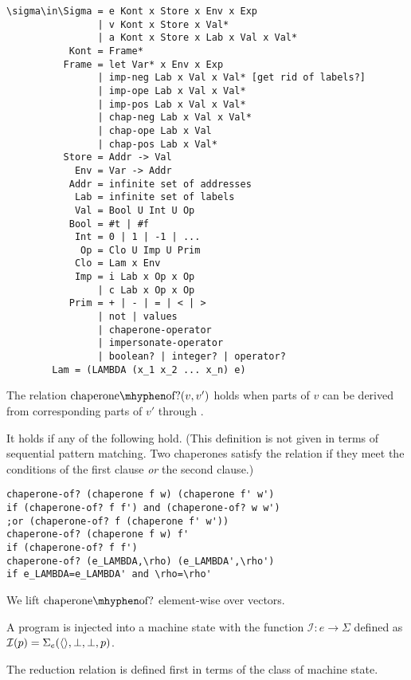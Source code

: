 \documentclass{sigplanconf}
\begin{document}
\begin{verbatim}
\sigma\in\Sigma = e Kont x Store x Env x Exp
                | v Kont x Store x Val*
                | a Kont x Store x Lab x Val x Val*
           Kont = Frame*
          Frame = let Var* x Env x Exp
                | imp-neg Lab x Val x Val* [get rid of labels?]
                | imp-ope Lab x Val x Val*
                | imp-pos Lab x Val x Val*
                | chap-neg Lab x Val x Val*
                | chap-ope Lab x Val
                | chap-pos Lab x Val*
          Store = Addr -> Val
            Env = Var -> Addr
           Addr = infinite set of addresses
            Lab = infinite set of labels
            Val = Bool U Int U Op
           Bool = #t | #f
            Int = 0 | 1 | -1 | ...
             Op = Clo U Imp U Prim
            Clo = Lam x Env
            Imp = i Lab x Op x Op
                | c Lab x Op x Op
           Prim = + | - | = | < | >
                | not | values
                | chaperone-operator
                | impersonate-operator
                | boolean? | integer? | operator?
 	    Lam = (LAMBDA (x_1 x_2 ... x_n) e)
\end{verbatim}

The relation $\mathrm{chaperone\mhyphen of?}(v,v')$ holds when parts of $v$ can be derived from corresponding parts of $v'$ through .

It holds if any of the following hold.
(This definition is not given in terms of sequential pattern matching. Two chaperones satisfy the relation if they meet the conditions of the first clause \emph{or} the second clause.)
\begin{verbatim}
chaperone-of? (chaperone f w) (chaperone f' w')
if (chaperone-of? f f') and (chaperone-of? w w')
;or (chaperone-of? f (chaperone f' w'))
chaperone-of? (chaperone f w) f'
if (chaperone-of? f f')
chaperone-of? (e_LAMBDA,\rho) (e_LAMBDA',\rho')
if e_LAMBDA=e_LAMBDA' and \rho=\rho'
\end{verbatim}

We lift $\mathrm{chaperone\mhyphen of?}$ element-wise over vectors.


A program is injected into a machine state with the function $\mathcal{I} : e\rightarrow\Sigma$ defined as $\mathcal{I}(p)=\Sigma_e(\langle\rangle,\perp,\perp,p)$.

The reduction relation is defined first in terms of the class of machine state.

\newcommand{\Aeval}[1]{\mathcal{A}(\sigma,\rho,#1)}
\end{document}
